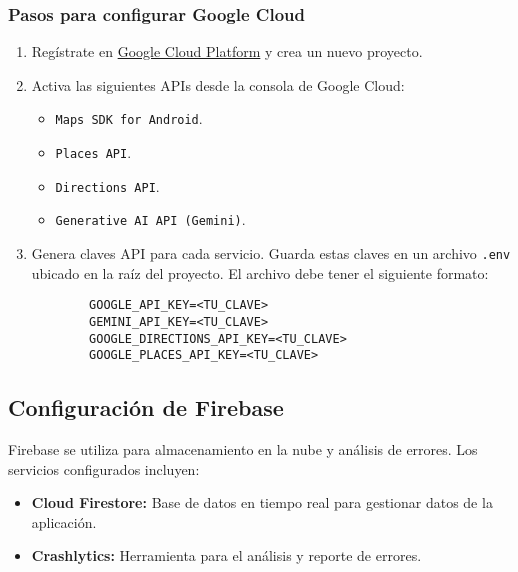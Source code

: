 \subsubsection{Pasos para configurar Google Cloud}
\begin{enumerate}
	\item Regístrate en \href{https://cloud.google.com/}{Google Cloud Platform} y crea un nuevo proyecto.
	\item Activa las siguientes APIs desde la consola de Google Cloud:
	\begin{itemize}
		\item \texttt{Maps SDK for Android}.
		\item \texttt{Places API}.
		\item \texttt{Directions API}.
		\item \texttt{Generative AI API (Gemini)}.
	\end{itemize}
	\item Genera claves API para cada servicio. Guarda estas claves en un archivo \texttt{.env} ubicado en la raíz del proyecto. El archivo debe tener el siguiente formato:
	\begin{verbatim}
		GOOGLE_API_KEY=<TU_CLAVE>
		GEMINI_API_KEY=<TU_CLAVE>
		GOOGLE_DIRECTIONS_API_KEY=<TU_CLAVE>
		GOOGLE_PLACES_API_KEY=<TU_CLAVE>
	\end{verbatim}
\end{enumerate}

\subsection{Configuración de Firebase}

Firebase se utiliza para almacenamiento en la nube y análisis de errores. Los servicios configurados incluyen:
\begin{itemize}
	\item \textbf{Cloud Firestore:} Base de datos en tiempo real para gestionar datos de la aplicación.
	\item \textbf{Crashlytics:} Herramienta para el análisis y reporte de errores.
\end{itemize}

